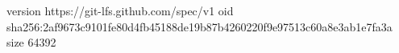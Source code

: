 version https://git-lfs.github.com/spec/v1
oid sha256:2af9673c9101fe80d4fb45188de19b87b4260220f9e97513c60a8e3ab1e7fa3a
size 64392
